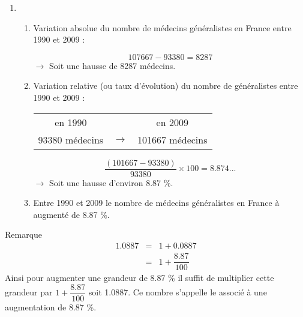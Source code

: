 \documentclass[xcolor={dvipsnames}]{beamer}
\begin{document}
\begin{frame}
\begin{enumerate}
	\item 
	\begin{enumerate} [a]
		\item Variation absolue du nombre de médecins généralistes en France entre 1990 et 2009 :\pause
		
		\begin{equation*}
		\num{107667} - \num{93380} = \num{8287}
		\end{equation*}
		$\rightarrow$  Soit une hausse de \num{8287} médecins.\pause
		
		
		\item Variation relative (ou taux d'évolution) du nombre de généralistes entre \num{1990} et \num{2009} :\pause
		
		\begin{table}[h!]
			\centering
			
			
			\begin{tabular}{|ccc|}
				\hline
				en \num{1990} &    & en \num{2009} \\
				\num{93380} médecins& $\rightarrow$ & \num{101667} médecins \\
				\hline
			\end{tabular}
		\end{table}
		
		\begin{equation*}
		\dfrac{(\num{101667} - \num{93380})}{\num{93380}} \times 100 = \num{8.874}...
		\end{equation*}
		$\rightarrow$ Soit une hausse d'environ \num{8.87} \%.\pause
		
		\item Entre 1990 et 2009 le nombre de médecins généralistes en France à augmenté de \num{8.87} \%.
	\end{enumerate}
\end{enumerate}
\end{frame}

\begin{frame}
			\begin{block}{Remarque}
			\begin{eqnarray*}
				\num{1.0887} & = & 1 + \num{0.0887} \\
				& = & 1 + \dfrac{\num{8.87}}{100}
			\end{eqnarray*}
%			
			Ainsi pour augmenter une grandeur de \num{8.87} \% il suffit de multiplier cette grandeur par $1 + \dfrac{8.87}{100}$ soit \num{1.0887}. Ce nombre s'appelle le  associé à une augmentation de \num{8.87} \%.
		\end{block}
\end{frame}
\end{document}
